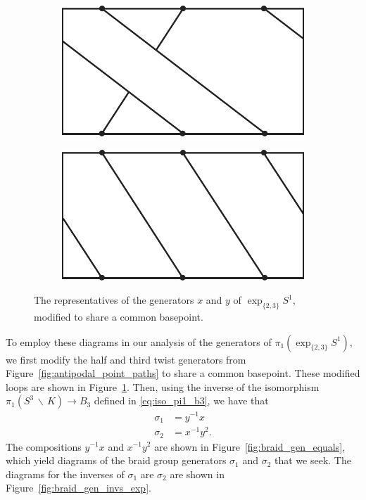 \documentclass[12pt,twoside]{reedthesis}
\theoremstyle{definition}
\newcommand{\exptwothree}{\exp_{\{2,3\}}}
\newcommand{\wo}{\, \backslash \,}
\begin{document}
\begin{figure}[h]
  \centering
  \begin{subfigure}[t]{0.23\textwidth}
    \centering
    \includegraphics[width=\textwidth]{figures/braid_gen_x.pdf}
  \end{subfigure}
  \hspace{5mm}
  \begin{subfigure}[t]{0.23\textwidth}
    \centering
    \includegraphics[width=\textwidth]{figures/braid_gen_y.pdf}
  \end{subfigure}
  \caption{The representatives of the generators $x$ and $y$ of $\exptwothree S^1$, modified to share a common basepoint.}
  \label{fig:common_basepoint_generators}
\end{figure}

To employ these diagrams in our analysis of the generators of $\pi_1(\exptwothree S^1)$, we first modify the half and third twist generators from Figure~\ref{fig:antipodal_point_paths} to share a common basepoint.
These modified loops are shown in Figure~\ref{fig:common_basepoint_generators}.
Then, using the inverse of the isomorphism $\pi_1(S^3 \wo K) \to B_3$ defined in \eqref{eq:iso_pi1_b3}, we have that
\begin{align*}
  \sigma_1 &= y^{-1} x \\
  \sigma_2 &= x^{-1} y^2.
\end{align*}
The compositions $y^{-1} x$ and $x^{-1} y^2$ are shown in Figure~\ref{fig:braid_gen_equals}, which yield diagrams of the braid group generators $\sigma_1$ and $\sigma_2$ that we seek.
The diagrams for the inverses of $\sigma_1$ are $\sigma_2$ are shown in Figure~\ref{fig:braid_gen_invs_exp}.
\end{document}
